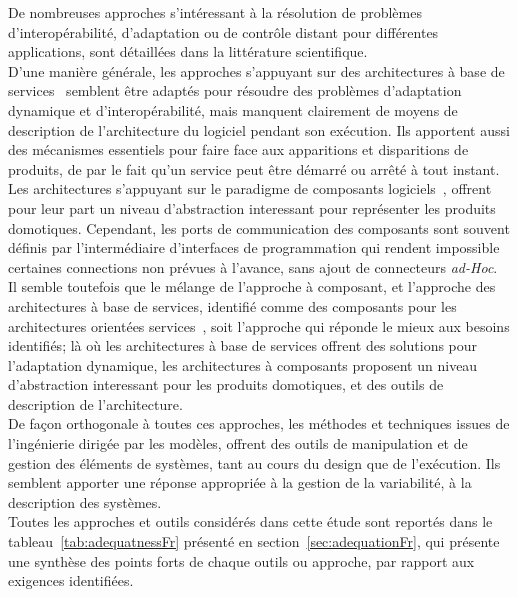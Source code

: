 De nombreuses approches s'intéressant à la résolution de problèmes d'interopérabilité, d'adaptation ou de contrôle distant pour différentes applications, sont détaillées dans la littérature scientifique.\\
D'une manière générale, les approches s'appuyant sur des architectures à base de services~\cite{OSGI:r4,Chappell:2004} semblent être adaptés pour résoudre des problèmes d'adaptation dynamique et d'interopérabilité, mais manquent clairement de moyens de description de l'architecture du logiciel pendant son exécution. Ils apportent aussi des mécanismes essentiels pour faire face aux apparitions et disparitions de produits, de par le fait qu'un service peut être démarré ou arrêté à tout instant.\\
Les architectures s'appuyant sur le paradigme de composants logiciels~\cite{Georgiadis:2002,RobVanOmmering:2000,Bruneton:2006}, offrent pour leur part un niveau d'abstraction interessant pour représenter les produits domotiques. Cependant, les ports de communication des composants sont souvent définis par l'intermédiaire d'interfaces de programmation qui rendent impossible certaines connections non prévues à l'avance, sans ajout de connecteurs {\it ad-Hoc}.\\
Il semble toutefois que le mélange de l'approche à composant, et l'approche des architectures à base de services, identifié comme des composants pour les architectures orientées services~\cite{sca:specs,Melisson:2010,Escoffier:2007}, soit l'approche qui réponde le mieux aux besoins identifiés; là où les architectures à base de services offrent des solutions pour l'adaptation dynamique, les architectures à composants proposent un niveau d'abstraction interessant pour les produits domotiques, et des outils de description de l'architecture.\\
De façon orthogonale à toutes ces approches, les méthodes et techniques issues de l'ingénierie dirigée par les modèles, offrent des outils de manipulation et de gestion des éléments de systèmes, tant au cours du design que de l'exécution. Ils semblent apporter une réponse appropriée à la gestion de la variabilité, à la description des systèmes.\\

Toutes les approches et outils considérés dans cette étude sont reportés dans le tableau~\ref{tab:adequatnessFr} présenté en section~\ref{sec:adequationFr}, qui présente une synthèse des points forts de chaque outils ou approche, par rapport aux exigences identifiées.


